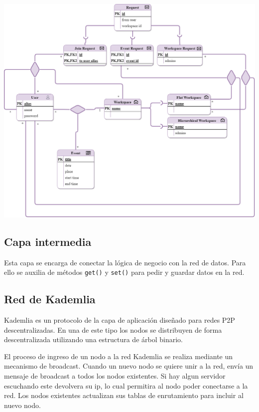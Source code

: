 \documentclass[10pt]{article} %
\begin{document}
	\begin{center}
		\includegraphics[scale=0.3]{modelo-merx}
	\end{center}
	

	
	\subsection{Capa intermedia}
	
	Esta capa se encarga de conectar la l\'ogica de negocio con la red de datos. Para ello se auxilia de m\'etodos \texttt{get()} y \texttt{set()} para pedir y guardar datos en la red.
	
	\subsection{Red de Kademlia}
	
	 Kademlia \cite{kad} es un protocolo de la capa de aplicación diseñado para redes P2P descentralizadas. En una de este tipo los nodos se distribuyen de forma descentralizada utilizando una estructura de árbol binario. 
	 
	El proceso de ingreso de un nodo a la red Kademlia se realiza mediante un mecanismo de broadcast. Cuando un nuevo nodo se quiere unir a la red, envía un mensaje de broadcast a todos los nodos existentes. Si hay algun servidor escuchando este devolvera su ip, lo cual permitira al nodo poder conectarse a la red. Los nodos existentes actualizan sus tablas de enrutamiento para incluir al nuevo nodo.
	 
\end{document}
